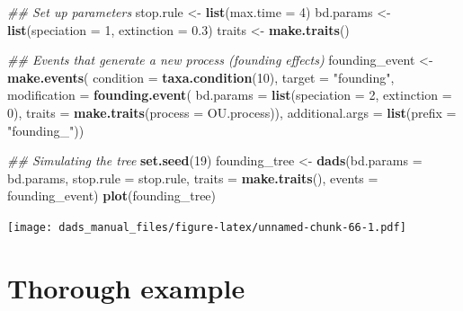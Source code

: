 \documentclass[]{book}
\newenvironment{Shaded}{\begin{snugshade}}{\end{snugshade}}
\newcommand{\CommentTok}[1]{\textcolor[rgb]{0.56,0.35,0.01}{\textit{#1}}}
\newcommand{\DataTypeTok}[1]{\textcolor[rgb]{0.13,0.29,0.53}{#1}}
\newcommand{\DecValTok}[1]{\textcolor[rgb]{0.00,0.00,0.81}{#1}}
\newcommand{\FloatTok}[1]{\textcolor[rgb]{0.00,0.00,0.81}{#1}}
\newcommand{\KeywordTok}[1]{\textcolor[rgb]{0.13,0.29,0.53}{\textbf{#1}}}
\newcommand{\NormalTok}[1]{#1}
\newcommand{\StringTok}[1]{\textcolor[rgb]{0.31,0.60,0.02}{#1}}
\begin{document}
\begin{Shaded}
\begin{Highlighting}[]
\CommentTok{## Set up parameters}
\NormalTok{stop.rule <-}\StringTok{ }\KeywordTok{list}\NormalTok{(}\DataTypeTok{max.time =} \DecValTok{4}\NormalTok{)}
\NormalTok{bd.params <-}\StringTok{ }\KeywordTok{list}\NormalTok{(}\DataTypeTok{speciation =} \DecValTok{1}\NormalTok{, }\DataTypeTok{extinction =} \FloatTok{0.3}\NormalTok{)}
\NormalTok{traits    <-}\StringTok{ }\KeywordTok{make.traits}\NormalTok{()}

\CommentTok{## Events that generate a new process (founding effects)}
\NormalTok{founding_event <-}\StringTok{ }\KeywordTok{make.events}\NormalTok{(}
                  \DataTypeTok{condition    =} \KeywordTok{taxa.condition}\NormalTok{(}\DecValTok{10}\NormalTok{),}
                  \DataTypeTok{target       =} \StringTok{"founding"}\NormalTok{,}
                  \DataTypeTok{modification =} \KeywordTok{founding.event}\NormalTok{(}
                                    \DataTypeTok{bd.params =} \KeywordTok{list}\NormalTok{(}\DataTypeTok{speciation =} \DecValTok{2}\NormalTok{,}
                                                     \DataTypeTok{extinction =} \DecValTok{0}\NormalTok{),}
                                    \DataTypeTok{traits =} \KeywordTok{make.traits}\NormalTok{(}\DataTypeTok{process =}\NormalTok{ OU.process)),}
                  \DataTypeTok{additional.args =} \KeywordTok{list}\NormalTok{(}\DataTypeTok{prefix =} \StringTok{"founding_"}\NormalTok{))}

\CommentTok{## Simulating the tree}
\KeywordTok{set.seed}\NormalTok{(}\DecValTok{19}\NormalTok{)}
\NormalTok{founding_tree <-}\StringTok{ }\KeywordTok{dads}\NormalTok{(}\DataTypeTok{bd.params =}\NormalTok{ bd.params,}
                      \DataTypeTok{stop.rule =}\NormalTok{ stop.rule,}
                      \DataTypeTok{traits    =} \KeywordTok{make.traits}\NormalTok{(),}
                      \DataTypeTok{events    =}\NormalTok{ founding_event)}
\KeywordTok{plot}\NormalTok{(founding_tree)}
\end{Highlighting}
\end{Shaded}

\texttt{[image: dads\_manual\_files/figure-latex/unnamed-chunk-66-1.pdf]}

\hypertarget{thorough-example}{%
\chapter{Thorough example}\label{thorough-example}}
\end{document}
